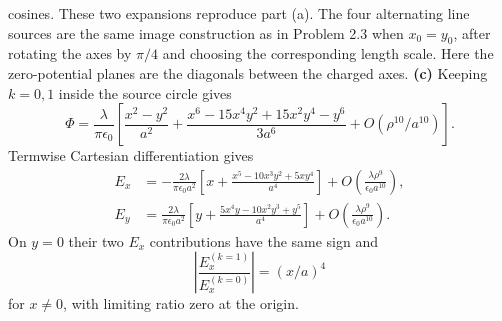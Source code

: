 cosines. These two expansions reproduce part (a).
The four alternating line sources are the same image construction
as in Problem 2.3 when $x_0=y_0$, after rotating the axes by $\pi/4$
and choosing the corresponding length scale. Here the zero-potential
planes are the diagonals between the charged axes.
\textbf{(c)} Keeping $k=0,1$ inside the source circle gives
\[
\Phi=\frac{\lambda}{\pi\epsilon _0}
 \left[\frac{x^2-y^2}{a^2}
 +\frac{x^6-15x^4y^2+15x^2y^4-y^6}{3a^6}
 +O(\rho^{10}/a^{10})\right].
\]
Termwise Cartesian differentiation gives
\[
\boxed{\begin{aligned}
E_x&=-\frac{2\lambda}{\pi\epsilon _0a^2}
 \left[x+\frac{x^5-10x^3y^2+5xy^4}{a^4}\right]
 +O\!\left(\frac{\lambda\rho^9}{\epsilon _0a^{10}}\right),\\
E_y&=\frac{2\lambda}{\pi\epsilon _0a^2}
 \left[y+\frac{5x^4y-10x^2y^3+y^5}{a^4}\right]
 +O\!\left(\frac{\lambda\rho^9}{\epsilon _0a^{10}}\right).
\end{aligned}}
\]
On $y=0$ their two $E_x$ contributions have the same sign and
\[
\boxed{\left|\frac{E_x^{(k=1)}}{E_x^{(k=0)}}\right|=(x/a)^4}
\]
for $x\ne0$, with limiting ratio zero at the origin.

